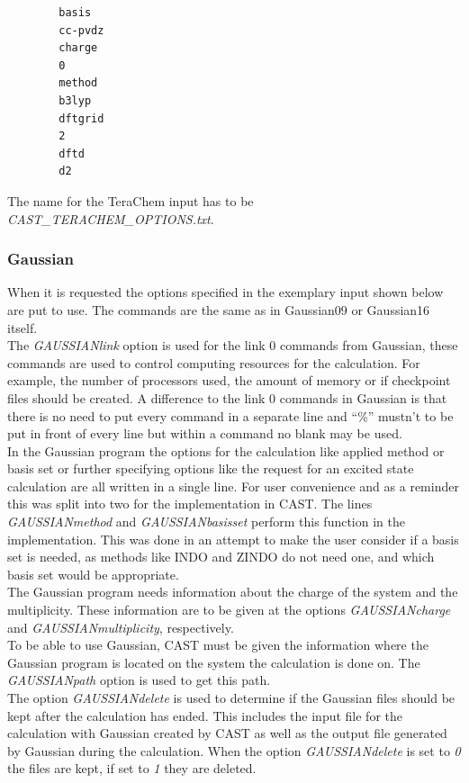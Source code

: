 \documentclass[10pt,a4paper]{article} %
\begin{document}
		\begin{lstlisting}
		basis
		cc-pvdz
		charge
		0
		method
		b3lyp
		dftgrid
		2
		dftd
		d2\end{lstlisting}

		The name for the TeraChem input has to be \glqq \textit{CAST\_TERACHEM\_OPTIONS.txt}\grqq.
			
			\subsubsection{Gaussian}
 When it is requested the options specified in the exemplary input shown below are put to use. The commands are the same as in Gaussian09\supercite{M.J.Frisch2009} or Gaussian16 itself.\\
The \textit{GAUSSIANlink} option is used for the link 0 commands from Gaussian, these commands are used to control computing resources for the calculation. For example, the number of processors used, the amount of memory or if checkpoint files should be created. A difference to the link 0 commands in Gaussian is that there is no need to put every command in a separate line and ``\%'' mustn't to be put in front of every line but within a command no blank may be used.\\
In the Gaussian program the options for the calculation like applied method or basis set or further specifying options like the request for an excited state calculation are all written in a single line. For user convenience and as a reminder this was split into two for the implementation in CAST. The lines \textit{GAUSSIANmethod} and \textit{GAUSSIANbasisset} perform this function in the implementation. This was done in an attempt to make the user consider if a basis set is needed, as methods like INDO\supercite{Pople1967} and ZINDO\supercite{Ridley1973,Ridley1976} do not need one, and which basis set would be appropriate.\\
The Gaussian program needs information about the charge of the system and the multiplicity. These information are to be given at the options \textit{GAUSSIANcharge} and \textit{GAUSSIANmultiplicity}, respectively.\\
To be able to use Gaussian, CAST must be given the information where the Gaussian program is located on the system the calculation is done on. The \textit{GAUSSIANpath} option is used to get this path.\\
The option \textit{GAUSSIANdelete} is used to determine if the Gaussian files should be kept after the calculation has ended. This includes the input file for the calculation with Gaussian created by CAST as well as the output file generated by Gaussian during the calculation. When the option \textit{GAUSSIANdelete} is set to \textit{0} the files are kept, if set to \textit{1} they are deleted.\\
\end{document}
